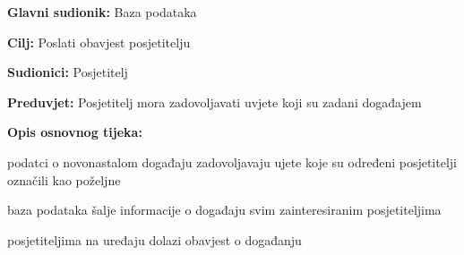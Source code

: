 					\noindent {}
					\begin{packed_item}
	
						\item \textbf{Glavni sudionik: }Baza podataka 
						\item  \textbf{Cilj:} Poslati obavjest posjetitelju 
						\item  \textbf{Sudionici:} Posjetitelj
						\item  \textbf{Preduvjet:} Posjetitelj mora zadovoljavati uvjete koji su zadani događajem
						\item  \textbf{Opis osnovnog tijeka:}
						
						\item[] \begin{packed_enum}
	
							\item podatci o novonastalom događaju zadovoljavaju ujete koje su određeni posjetitelji označili kao poželjne
							\item baza podataka šalje informacije o događaju svim zainteresiranim posjetiteljima
							\item posjetiteljima na uređaju dolazi obavjest o događanju
						\end{packed_enum}
						
					\end{packed_item}
					
